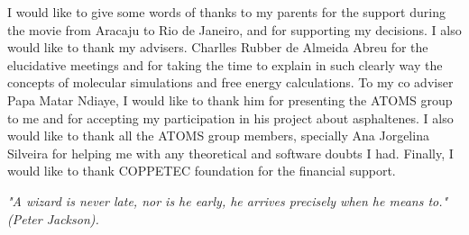 \documentclass[
	12pt,				%
	openany,			%
	oneside,			%
	a4paper,			%
	english,			%
	brazil				%
	]{abntex2}
\begin{document}
\begin{agradecimentos}
I would like to give some words of thanks to my parents for the support during the movie from Aracaju to Rio de Janeiro, and for supporting my decisions. I also would like to thank my advisers. Charlles Rubber de Almeida Abreu for the elucidative meetings and for taking the time to explain in such clearly way the concepts of molecular simulations and free energy calculations. To my co adviser Papa Matar Ndiaye, I would like to thank him for presenting the ATOMS group to me and for accepting my participation in his project about asphaltenes. I also would like to thank all the ATOMS group members, specially Ana Jorgelina Silveira  for helping me with any theoretical and software doubts I had. Finally, I would like to thank COPPETEC foundation for the financial support. 
\end{agradecimentos}

\begin{epigrafe}
    \vspace*{\fill}
	\begin{flushright}
		\textit{"A wizard is never late, nor is he early, he arrives precisely when he means to."
		(Peter Jackson).}
	\end{flushright}
\end{epigrafe}


\setlength{\absparsep}{18pt} %
%
\end{document}
